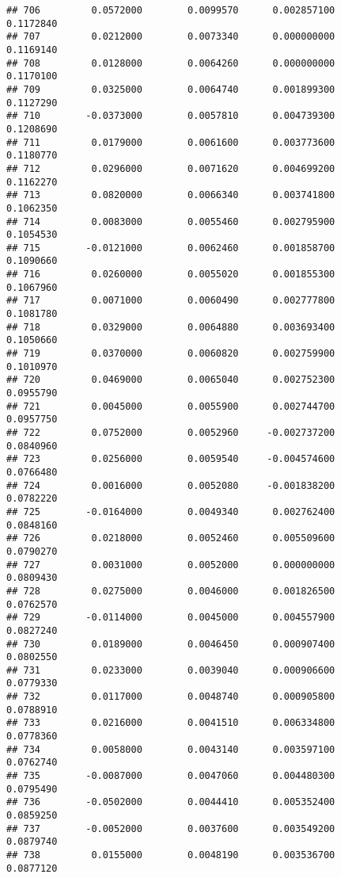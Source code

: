 \documentclass[
]{article}
\begin{document}
\begin{verbatim}
## 706         0.0572000        0.0099570      0.002857100             0.1172840
## 707         0.0212000        0.0073340      0.000000000             0.1169140
## 708         0.0128000        0.0064260      0.000000000             0.1170100
## 709         0.0325000        0.0064740      0.001899300             0.1127290
## 710        -0.0373000        0.0057810      0.004739300             0.1208690
## 711         0.0179000        0.0061600      0.003773600             0.1180770
## 712         0.0296000        0.0071620      0.004699200             0.1162270
## 713         0.0820000        0.0066340      0.003741800             0.1062350
## 714         0.0083000        0.0055460      0.002795900             0.1054530
## 715        -0.0121000        0.0062460      0.001858700             0.1090660
## 716         0.0260000        0.0055020      0.001855300             0.1067960
## 717         0.0071000        0.0060490      0.002777800             0.1081780
## 718         0.0329000        0.0064880      0.003693400             0.1050660
## 719         0.0370000        0.0060820      0.002759900             0.1010970
## 720         0.0469000        0.0065040      0.002752300             0.0955790
## 721         0.0045000        0.0055900      0.002744700             0.0957750
## 722         0.0752000        0.0052960     -0.002737200             0.0840960
## 723         0.0256000        0.0059540     -0.004574600             0.0766480
## 724         0.0016000        0.0052080     -0.001838200             0.0782220
## 725        -0.0164000        0.0049340      0.002762400             0.0848160
## 726         0.0218000        0.0052460      0.005509600             0.0790270
## 727         0.0031000        0.0052000      0.000000000             0.0809430
## 728         0.0275000        0.0046000      0.001826500             0.0762570
## 729        -0.0114000        0.0045000      0.004557900             0.0827240
## 730         0.0189000        0.0046450      0.000907400             0.0802550
## 731         0.0233000        0.0039040      0.000906600             0.0779330
## 732         0.0117000        0.0048740      0.000905800             0.0788910
## 733         0.0216000        0.0041510      0.006334800             0.0778360
## 734         0.0058000        0.0043140      0.003597100             0.0762740
## 735        -0.0087000        0.0047060      0.004480300             0.0795490
## 736        -0.0502000        0.0044410      0.005352400             0.0859250
## 737        -0.0052000        0.0037600      0.003549200             0.0879740
## 738         0.0155000        0.0048190      0.003536700             0.0877120

\end{verbatim}
\end{document}
